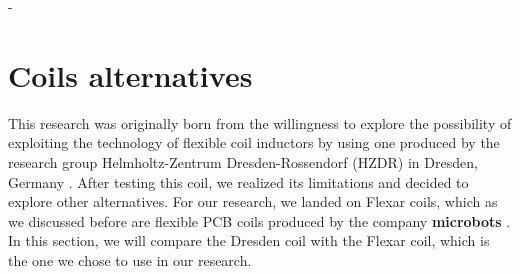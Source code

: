 -\section{Coils alternatives}
This research was originally born from the willingness to explore the possibility of exploiting the technology of flexible coil inductors by using one produced by the research group Helmholtz-Zentrum Dresden-Rossendorf (HZDR) in Dresden, Germany \cite{HZDR}.
After testing this coil, we realized its limitations and decided to explore other alternatives.
For our research, we landed on Flexar coils, which as we discussed before are flexible PCB coils produced by the company \textbf{microbots} \cite{microbots}.
In this section, we will compare the Dresden coil with the Flexar coil, which is the one we chose to use in our research.



